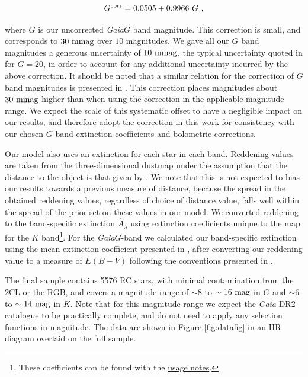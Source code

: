 \documentclass[fleqn,usenatbib]{mnras}
\newcommand{\nstars}{5576 \xspace} %
\newcommand{\gaia}{\emph{Gaia}\xspace}
\newcommand{\Ks}{\mbox{$K$}\xspace}
\newcommand{\up}[1]{#1}
\begin{document}
\begin{equation}
G^{\rm corr} = 0.0505 + 0.9966\ G\ ,
\end{equation}

\noindent where $G$ is our uncorrected \gaia $G$ band magnitude. This correction is small, and corresponds to $30\ \rm mmag$ over $10$ magnitudes. We gave all our $G$ band magnitudes a generous uncertainty of $10\ \rm mmag$, the typical uncertainty quoted in \cite{art:gaiacollaboration+2018} for $G = 20$, in order to account for any additional uncertainty incurred by the above correction. \up{It should be noted that a similar relation for the correction of $G$ band magnitudes is presented in \cite{art:maizapellaniz+weiler2018}. This correction places magnitudes about $30\ \rm mmag$ higher than when using the \cite{art:casagrande+vandenberg2018} correction in the applicable magnitude range. We expect the scale of this systematic offset to have a negligible impact on our results, and therefore adopt the \cite{art:casagrande+vandenberg2018} correction in this work for consistency with our chosen $G$ band extinction coefficients and bolometric corrections.}

Our model also uses an extinction for each star in each band. Reddening values are taken from the \cite{art:green+2018} three-dimensional dustmap under the assumption that the distance to the object is that given by \cite{art:bailer-jones+2018}. We note that this is not expected to bias our results towards a previous measure of distance, because the spread in the obtained reddening values, regardless of choice of distance value, falls well within the spread of the prior set on these values in our model. We converted reddening to the band-specific extinction $\hat{A}_\lambda$ using extinction coefficients unique to the \cite{art:green+2018} map for the \Ks band\footnote{These coefficients can be found with the \cite{art:green+2018} \href{http://argonaut.skymaps.info/usage\#units}{usage notes}.}. For the \gaia $G$-band we calculated our band-specific extinction using the mean extinction coefficient presented in \cite{art:casagrande+vandenberg2018}, after converting our reddening value to a measure of $E(B-V)$ following the conventions presented in \cite{art:green+2018}.

The final sample contains \nstars RC stars, with minimal contamination from the 2CL or the RGB, and covers a magnitude range of $\sim8$ to $\sim16\ \rm{mag}$ in $G$ and $\sim6$ to $\sim14\ \rm{mag}$ in $K$. \up{Note that for this magnitude range we expect the \gaia DR2 catalogue to be practically complete, and do not need to apply any selection functions in magnitude.} The data are shown in Figure \ref{fig:datafig} in an HR diagram overlaid on the full  sample.
\end{document}
